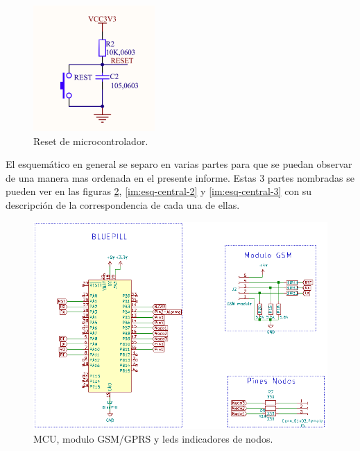 \begin{figure}[!h]
	\centering
	\includegraphics[scale=0.6]{images/central/bluepill-reset.png}
    \caption{Reset de microcontrolador.}
	\label{im:reset-bluepill}
\end{figure}

\par El esquemático en general se separo en varias partes para que se puedan observar de una manera mas ordenada en el presente informe. Estas 3 partes nombradas se pueden ver en las figuras \ref{im:esq-central-1}, \ref{im:esq-central-2} y \ref{im:esq-central-3} con su descripción de la correspondencia de cada una de ellas. 

\begin{figure}[!h]
	\centering
	\includegraphics[scale=.50]{images/central/central-esq-1.png}
    \caption{MCU, modulo GSM/GPRS y leds indicadores de nodos.}
	\label{im:esq-central-1}
\end{figure}

